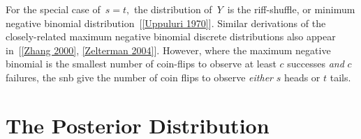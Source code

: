 \documentclass[12pt]{article}         %
\begin{document}
For the special case of $\,s=t,$ the distribution of $\,Y\,$ is the 
riff-shuffle, or minimum negative binomial distribution~[\ref{Uppuluri 1970}].
Similar derivations of the closely-related maximum negative binomial discrete 
distributions also appear in~[\ref{Zhang 2000}, \ref{Zelterman 2004}]. However,
where the maximum negative binomial is the smallest number of coin-flips 
to observe at least $c$ successes {\em and} $c$ failures, the snb give
the number of coin flips to observe {\em either} $s$ heads or $t$ tails.



\section{The Posterior Distribution}

\end{document}
